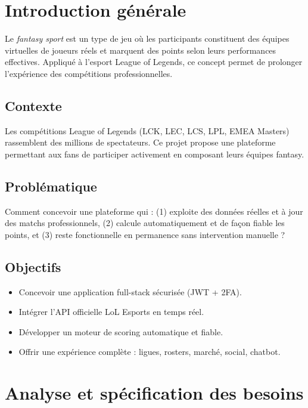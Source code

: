 \documentclass[12pt,a4paper]{report}
\begin{document}
\tableofcontents

\chapter{Introduction générale}
Le \textit{fantasy sport} est un type de jeu où les participants constituent des
équipes virtuelles de joueurs réels et marquent des points selon leurs
performances effectives. Appliqué à l'esport League of Legends, ce concept
permet de prolonger l'expérience des compétitions professionnelles.

\section{Contexte}
Les compétitions League of Legends (LCK, LEC, LCS, LPL, EMEA Masters) rassemblent
des millions de spectateurs. Ce projet propose une plateforme permettant aux
fans de participer activement en composant leurs équipes fantasy.

\section{Problématique}
Comment concevoir une plateforme qui : (1) exploite des données réelles et à jour
des matchs professionnels, (2) calcule automatiquement et de façon fiable les
points, et (3) reste fonctionnelle en permanence sans intervention manuelle ?

\section{Objectifs}
\begin{itemize}
  \item Concevoir une application full-stack sécurisée (JWT + 2FA).
  \item Intégrer l'API officielle LoL Esports en temps réel.
  \item Développer un moteur de scoring automatique et fiable.
  \item Offrir une expérience complète : ligues, rosters, marché, social, chatbot.
\end{itemize}

\chapter{Analyse et spécification des besoins}
\end{document}
